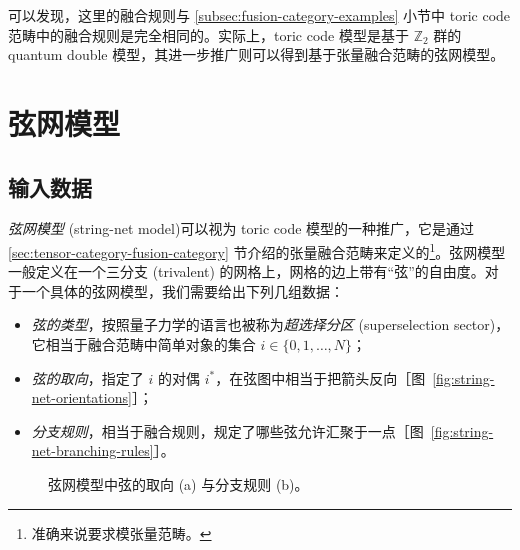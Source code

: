 可以发现，这里的融合规则与 \ref{subsec:fusion-category-examples} 小节中 toric code 范畴中的融合规则是完全相同的。实际上，toric code 模型是基于 $\mathbb{Z}_2$ 群的 quantum double 模型，其进一步推广则可以得到基于张量融合范畴的弦网模型。

\section{弦网模型}

\subsection{输入数据}

\emph{弦网模型} (string-net model)\cite{levin2005string,levin2006detecting}可以视为 toric code 模型的一种推广，它是通过 \ref{sec:tensor-category-fusion-category} 节介绍的张量融合范畴来定义的\footnote{准确来说要求模张量范畴。}。弦网模型一般定义在一个三分支 (trivalent) 的网格上，网格的边上带有“弦”的自由度。对于一个具体的弦网模型，我们需要给出下列几组数据：
\begin{itemize}
  \item \emph{弦的类型}，按照量子力学的语言也被称为\emph{超选择分区} (superselection sector)，它相当于融合范畴中简单对象的集合 $i\in\{0,1,\dots,N\}$；
  \item \emph{弦的取向}，指定了 $i$ 的对偶 $i^*$，在弦图中相当于把箭头反向［图~\ref{fig:string-net-orientations}］；
  \item \emph{分支规则}，相当于融合规则，规定了哪些弦允许汇聚于一点［图~\ref{fig:string-net-branching-rules}］。
\end{itemize}

\begin{figure}[htb]
  \centering
   \qquad
  \caption[弦网模型中弦的取向与分支规则]{弦网模型中弦的取向 (a) 与分支规则 (b)。}
\end{figure}

